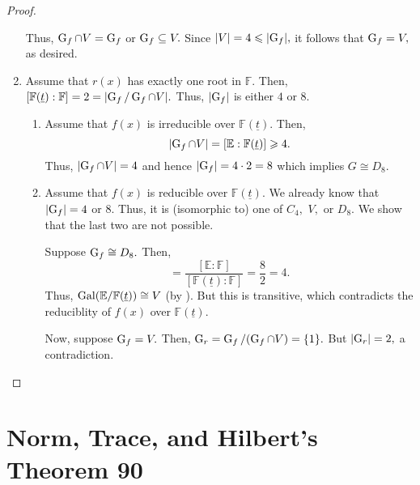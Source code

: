 \begin{proof}
\begin{enumerate}[leftmargin=*]
        Thus, $\operatorname{G}_f \cap V = \operatorname{G}_f$ or $\operatorname{G}_f \subseteq V.$ Since ${\left\lvert V \right\lvert} = 4 \leqslant {\left\lvert \operatorname{G}_f \right\lvert},$ it follows that $\operatorname{G}_f = V,$ as desired.
        \item Assume that $r(x)$ has exactly one root in $\mathbb{F}.$ Then, $[\mathbb{F}(\underline{t}) : \mathbb{F}] = 2 = {\left\lvert \operatorname{G}_f/\operatorname{G}_f \cap V \right\lvert}.$ Thus, ${\left\lvert \operatorname{G}_f \right\lvert}$ is either $4$ or $8.$
        \begin{enumerate}
            \item Assume that $f(x)$ is irreducible over $\mathbb{F}(\underline{t}).$ Then,
            \begin{equation*} 
                {\left\lvert \operatorname{G}_f \cap V \right\lvert} = [\mathbb{E} : \mathbb{F}(\underline{t})] \geqslant 4.
            \end{equation*}
            Thus, ${\left\lvert \operatorname{G}_f \cap V \right\lvert} = 4$ and hence ${\left\lvert \operatorname{G}_f \right\lvert} = 4 \cdot 2 = 8$ which implies $G \cong D_8.$
            \item Assume that $f(x)$ is reducible over $\mathbb{F}(\underline{t}).$ We already know that ${\left\lvert \operatorname{G}_f \right\lvert} = 4$ or $8.$ Thus, it is (isomorphic to) one of $C_4,$ $V,$ or $D_8.$ We show that the last two are not possible.

            Suppose $\operatorname{G}_f \cong D_8.$ Then,
            \begin{equation*} 
                [\mathbb{E} : \mathbb{F}(\underline{t})] = \frac{[\mathbb{E} : \mathbb{F}]}{[\mathbb{F}(\underline{t}) : \mathbb{F}]} = \frac{8}{2} = 4.
            \end{equation*}
            Thus, $\operatorname{Gal}(\mathbb{E}/\mathbb{F}(\underline{t})) \cong V$ (by ). But this is transitive, which contradicts the reduciblity of $f(x)$ over $\mathbb{F}(\underline{t}).$

            Now, suppose $\operatorname{G}_f = V.$ Then, $\operatorname{G}_r = \operatorname{G}_f/(\operatorname{G}_f \cap V) = \{1\}.$ But ${\left\lvert \operatorname{G}_r \right\lvert} = 2,$ a contradiction. \qedhere
        \end{enumerate}
    \end{enumerate}
\end{proof}

\section{Norm, Trace, and Hilbert's Theorem 90}

